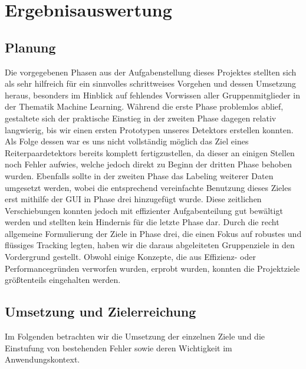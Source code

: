 \chapter{Ergebnisauswertung}
\label{ch:ergebnis}


\section{Planung}
Die vorgegebenen Phasen aus der Aufgabenstellung dieses Projektes stellten sich als sehr hilfreich für ein sinnvolles schrittweises Vorgehen und dessen Umsetzung heraus, besonders im Hinblick auf fehlendes Vorwissen aller Gruppenmitglieder in der Thematik Machine Learning. Während die erste Phase problemlos ablief, gestaltete sich der praktische Einstieg in der zweiten Phase dagegen relativ langwierig, bis wir einen ersten Prototypen unseres Detektors erstellen konnten. Als Folge dessen war es uns nicht vollständig möglich das Ziel eines Reiterpaardetektors bereits komplett fertigzustellen, da dieser an einigen Stellen noch Fehler aufwies, welche jedoch direkt zu Beginn der dritten Phase behoben wurden. Ebenfalls sollte in der zweiten Phase das Labeling weiterer Daten umgesetzt werden, wobei die entsprechend vereinfachte Benutzung dieses Zieles erst mithilfe der GUI in Phase drei hinzugefügt wurde. Diese zeitlichen Verschiebungen konnten jedoch mit effizienter Aufgabenteilung gut bewältigt werden und stellten kein Hindernis für die letzte Phase dar.
Durch die recht allgemeine Formulierung der Ziele in Phase drei, die einen Fokus auf robustes und flüssiges Tracking legten, haben wir die daraus abgeleiteten Gruppenziele in den Vordergrund gestellt. Obwohl einige Konzepte, die aus Effizienz- oder Performancegründen verworfen wurden, erprobt wurden, konnten die Projektziele größtenteils eingehalten werden. 

\section{Umsetzung und Zielerreichung}
Im Folgenden betrachten wir die Umsetzung der einzelnen Ziele und die Einstufung von bestehenden Fehler sowie deren Wichtigkeit im Anwendungskontext.



